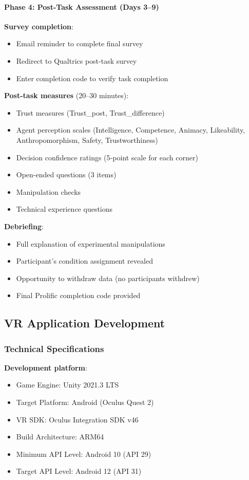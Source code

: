 \documentclass[12pt]{article}
\begin{document}
\paragraph{Phase 4: Post-Task Assessment (Days 3--9)}

\textbf{Survey completion}:
\begin{itemize}
    \item Email reminder to complete final survey
    \item Redirect to Qualtrics post-task survey
    \item Enter completion code to verify task completion
\end{itemize}

\textbf{Post-task measures} (20--30 minutes):
\begin{itemize}
    \item Trust measures (Trust\_post, Trust\_difference)
    \item Agent perception scales (Intelligence, Competence, Animacy, Likeability, Anthropomorphism, Safety, Trustworthiness)
    \item Decision confidence ratings (5-point scale for each corner)
    \item Open-ended questions (3 items)
    \item Manipulation checks
    \item Technical experience questions
\end{itemize}

\textbf{Debriefing}:
\begin{itemize}
    \item Full explanation of experimental manipulations
    \item Participant's condition assignment revealed
    \item Opportunity to withdraw data (no participants withdrew)
    \item Final Prolific completion code provided
\end{itemize}

\subsection{VR Application Development}

\subsubsection{Technical Specifications}

\textbf{Development platform}:
\begin{itemize}
    \item Game Engine: Unity 2021.3 LTS
    \item Target Platform: Android (Oculus Quest 2)
    \item VR SDK: Oculus Integration SDK v46
    \item Build Architecture: ARM64
    \item Minimum API Level: Android 10 (API 29)
    \item Target API Level: Android 12 (API 31)
\end{itemize}
\end{document}
